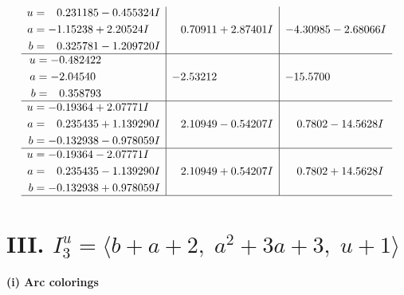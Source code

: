 \documentclass[1p]{elsarticle_modified}
\theoremstyle{definition}
\begin{document}
$$\begin{array}{c|c|c}
\begin{aligned}
u &= \phantom{-}0.231185 - 0.455324 I \\
a &= -1.15238 + 2.20524 I \\
b &= \phantom{-}0.325781 - 1.209720 I\end{aligned}
 & \phantom{-}0.70911 + 2.87401 I & -4.30985 - 2.68066 I \\ \hline\begin{aligned}
u &= -0.482422\phantom{ +0.000000I} \\
a &= -2.04540\phantom{ +0.000000I} \\
b &= \phantom{-}0.358793\phantom{ +0.000000I}\end{aligned}
 & -2.53212\phantom{ +0.000000I} & -15.5700\phantom{ +0.000000I} \\ \hline\begin{aligned}
u &= -0.19364 + 2.07771 I \\
a &= \phantom{-}0.235435 + 1.139290 I \\
b &= -0.132938 - 0.978059 I\end{aligned}
 & \phantom{-}2.10949 - 0.54207 I & \phantom{-}0.7802 - 14.5628 I \\ \hline\begin{aligned}
u &= -0.19364 - 2.07771 I \\
a &= \phantom{-}0.235435 - 1.139290 I \\
b &= -0.132938 + 0.978059 I\end{aligned}
 & \phantom{-}2.10949 + 0.54207 I & \phantom{-}0.7802 + 14.5628 I\\
 \hline 
 \end{array}$$\newpage\newpage\renewcommand{\arraystretch}{1}
\centering \section*{III. $I^u_{3}= \langle b+a+2,\;a^2+3 a+3,\;u+1 \rangle$}
\flushleft \textbf{(i) Arc colorings}\\
\end{document}
